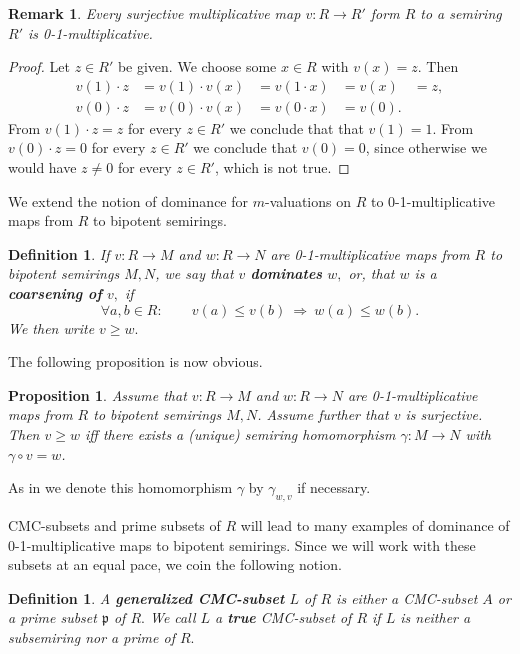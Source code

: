 \documentclass [12pt,a4paper,reqno]{amsart}
\newtheorem{prop}[thm]{Proposition}
\newtheorem{remark}[thm]{Remark}
\newtheorem{defn}[thm]{Definition}
\begin{document}
\begin{remark}\label{rmk4.13}
Every surjective multiplicative map   $v: R \to R'$ form $R$ to a
semiring  $R'$ is 0-1-multiplicative.
\end{remark}

\begin{proof} Let $z \in R' $ be given. We choose some $x\in R$
with $v(x) = z$. Then
$$
\begin{array}{lllll}
v(1) \cdot z  & =  v(1) \cdot v(x) & =  v(1 \cdot x) &= v(x) &  =
z, \\[2mm]
 v(0) \cdot z & =  v(0) \cdot v(x) & =  v(0 \cdot x) &  = v( 0).& \end{array}
$$
From $ v(1) \cdot z = z$ for every $z \in R'$ we  conclude that
that $v(1)=1.$ From $ v(0) \cdot z = 0$ for every $z \in R'$ we
conclude that  $v(0)=0$, since otherwise we  would have $z \neq 0$
for every $z \in R'$, which is not true.
\end{proof}

We extend the notion of dominance for $m$-valuations on $R$
\cite[\S 2]{IKR1} to 0-1-multiplicative maps from $R$ to bipotent
semirings.

\begin{defn}\label{defn4.13}  If $v:R\to
M$ and $w:R\to N$ are 0-1-multiplicative maps  from $R$ to
bipotent semirings $M,N$, we say that $v$ {\textbf{{dominates}}} $w,$
or, that $w$ is a {\textbf{{coarsening of}}} $v,$ if
$$\forall a,b\in R: \qquad  v(a)\le v(b) \ \Rightarrow \ w(a)\le w(b).$$
We then write $v \geq w.$
\end{defn}

The following proposition is now obvious.
\begin{prop}\label{prop4.15}
Assume that  $v:R\to M$ and $w:R\to N$ are 0-1-multiplicative maps
from $R$ to bipotent semirings $M,N$. Assume further that $v$ is
surjective. Then $v \geq w$  iff there exists a (unique) semiring
homomorphism  ${\gamma}: M \to N$ with ${\gamma} \circ v = w$.

\end{prop}

As in \cite[\S 2]{IKR1} we denote this homomorphism ${\gamma}$ by
${\gamma}_{w,v}$ if necessary. {\vskip 1.5mm \noindent}

CMC-subsets and prime subsets of $R$ will lead  to many examples
of dominance of 0-1-multiplicative maps to bipotent semirings.
Since we will work with these subsets at an equal pace, we coin
the following notion.

\begin{defn}\label{defn4.14} A {\textbf{{generalized CMC-subset}}} $L$
of $R$ is either a CMC-subset $A$ or a prime subset ${\mathfrak p}$ of $R.$
We call $L$ a {\textbf{{true}}} CMC-subset of $R$ if $L$ is neither a
subsemiring nor a prime of $R.$\end{defn}
\end{document}
